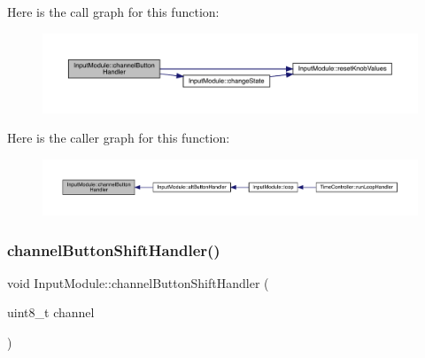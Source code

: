 Here is the call graph for this function\+:
\nopagebreak
\begin{figure}[H]
\begin{center}
\leavevmode
\includegraphics[width=350pt]{class_input_module_a62ad05f2e4880aeae014d99ecfcd494d_cgraph}
\end{center}
\end{figure}
Here is the caller graph for this function\+:
\nopagebreak
\begin{figure}[H]
\begin{center}
\leavevmode
\includegraphics[width=350pt]{class_input_module_a62ad05f2e4880aeae014d99ecfcd494d_icgraph}
\end{center}
\end{figure}
\mbox{\label{class_input_module_a2e678e1a6f2d7b9f91a6e6f1e3125e89}} 
\subsubsection{\texorpdfstring{channel\+Button\+Shift\+Handler()}{channelButtonShiftHandler()}}
{\footnotesize\ttfamily void Input\+Module\+::channel\+Button\+Shift\+Handler (\begin{DoxyParamCaption}\item[{uint8\+\_\+t}]{channel }\end{DoxyParamCaption})}

